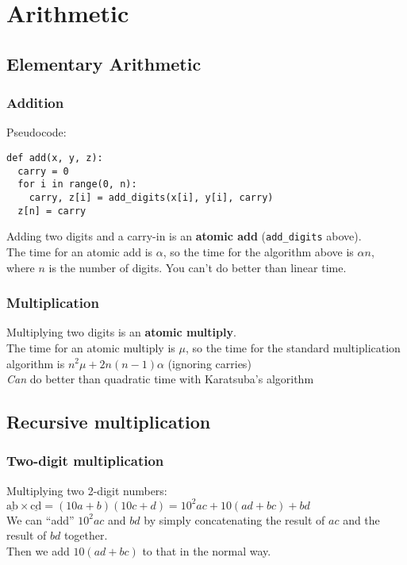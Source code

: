 \section{Arithmetic}

\subsection{Elementary Arithmetic}

\subsubsection*{Addition}

Pseudocode:
\begin{verbatim}
def add(x, y, z):
  carry = 0
  for i in range(0, n):
    carry, z[i] = add_digits(x[i], y[i], carry)
  z[n] = carry
\end{verbatim}

Adding two digits and a carry-in is an \textbf{atomic add} (\verb|add_digits| above).\\
The time for an atomic add is $\alpha$, so the time for the algorithm above is $\alpha n$, where $n$ is the number of digits. You can't do better than linear time.

\subsubsection*{Multiplication}

Multiplying two digits is an \textbf{atomic multiply}.\\
The time for an atomic multiply is $\mu$, so the time for the standard multiplication algorithm is $n^2\mu + 2n(n-1)\alpha$ (ignoring carries)\\
\emph{Can} do better than quadratic time with Karatsuba's algorithm

\subsection{Recursive multiplication}

\subsubsection*{Two-digit multiplication}

Multiplying two 2-digit numbers: $\underline{\mathrm{ab}} \times \underline{\mathrm{cd}} = (10a + b)(10c + d) = 10^2ac + 10(ad + bc) + bd$\\
We can ``add'' $10^2ac$ and $bd$ by simply concatenating the result of $ac$ and the result of $bd$ together.\\
Then we add $10(ad + bc)$ to that in the normal way.

